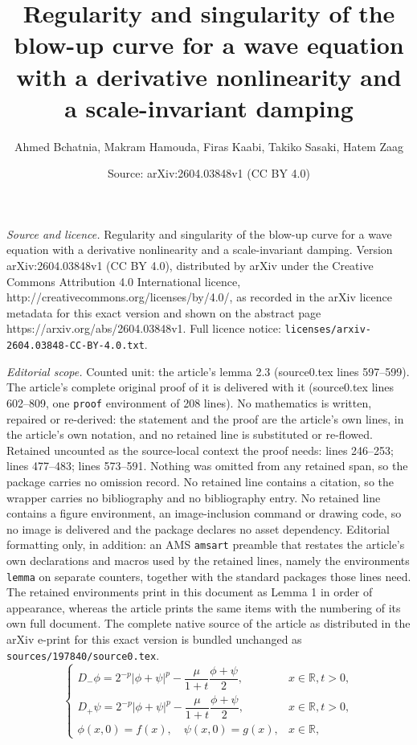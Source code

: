 \documentclass[10pt,a4paper]{amsart}
\title{Regularity and singularity of the blow-up curve for a wave equation with a derivative nonlinearity and a scale-invariant damping}
\author{Ahmed Bchatnia, Makram Hamouda, Firas Kaabi, Takiko Sasaki, Hatem Zaag}
\date{Source: arXiv:2604.03848v1 (CC BY 4.0)}
\begin{document}
\maketitle

\noindent\emph{Source and licence.} Regularity and singularity of the blow-up curve for a wave equation with a derivative nonlinearity and a scale-invariant damping. Version arXiv:2604.03848v1 (CC BY 4.0), distributed by arXiv under the Creative Commons Attribution 4.0 International licence, http://creativecommons.org/licenses/by/4.0/, as recorded in the arXiv licence metadata for this exact version and shown on the abstract page https://arxiv.org/abs/2604.03848v1. Full licence notice: \texttt{licenses/arxiv-2604.03848-CC-BY-4.0.txt}.\par\smallskip

\noindent\textit{Editorial scope.} Counted unit: the article's lemma 2.3 (source0.tex lines 597--599). The article's complete original proof of it is delivered with it (source0.tex lines 602--809, one \texttt{proof} environment of 208 lines). No mathematics is written, repaired or re-derived: the statement and the proof are the article's own lines, in the article's own notation, and no retained line is substituted or re-flowed.  Retained uncounted as the source-local context the proof needs: lines 246--253; lines 477--483; lines 573--591.  Nothing was omitted from any retained span, so the package carries no omission record.  No retained line contains a citation, so the wrapper carries no bibliography and no bibliography entry.  No retained line contains a figure environment, an image-inclusion command or drawing code, so no image is delivered and the package declares no asset dependency.  Editorial formatting only, in addition: an AMS \texttt{amsart} preamble that restates the article's own declarations and macros used by the retained lines, namely the environments \texttt{lemma} on separate counters, together with the standard packages those lines need.  The retained environments print in this document as Lemma 1 in order of appearance, whereas the article prints the same items with the numbering of its own full document.  The complete native source of the article as distributed in the arXiv e-print for this exact version is bundled unchanged as \texttt{sources/197840/source0.tex}.
\begin{equation}
\label{1.5}
\begin{cases}
D_- \phi = 2^{-p}|\phi + \psi|^p - \dfrac{\mu}{1 + t} \dfrac{\phi + \psi}{2}, & x \in \mathbb{R}, t > 0, \\
D_+ \psi = 2^{-p}|\phi + \psi|^p - \dfrac{\mu}{1 + t} \dfrac{\phi + \psi}{2}, & x \in \mathbb{R}, t > 0, \\
\phi(x, 0) = f(x), \quad \psi(x, 0) = g(x), & x \in \mathbb{R},
\end{cases}
\end{equation}
\end{document}
